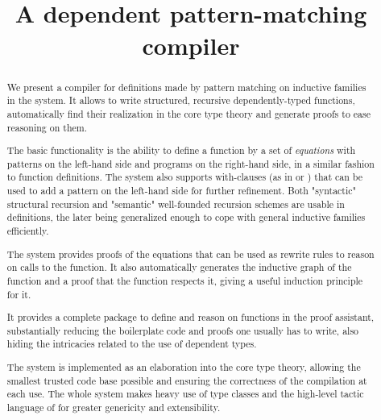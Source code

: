 \documentclass[9pt]{sigplanconf}
\title{\Equations\\
  A dependent pattern-matching compiler}
\begin{document}
\maketitle

\begin{abstract}
  We present a compiler for definitions made by pattern matching on
  inductive families in the \Coq system. It allows to write structured,
  recursive dependently-typed functions, automatically find their
  realization in the core type theory and generate proofs to ease
  reasoning on them.
  
  The basic functionality is the ability to define a function by a set
  of \textit{equations} with patterns on the left-hand side and programs
  on the right-hand side, in a similar fashion to \Haskell
  function definitions. The system also supports with-clauses (as in
  \Epigram or \Agda) that can be used to add a pattern on the left-hand
  side for further refinement. Both "syntactic" structural recursion and
  "semantic" well-founded recursion schemes are usable in definitions,
  the later being generalized enough to cope with general inductive
  families efficiently.
  
  The system provides proofs of the equations that can be used as
  rewrite rules to reason on calls to the function. It also
  automatically generates the inductive graph of the function and a
  proof that the function respects it, giving a useful induction
  principle for it.

  It provides a complete package to define 
  and reason on functions in the proof assistant, substantially
  reducing the boilerplate code and proofs one usually has to write, 
  also hiding the intricacies related to the use of dependent types.
  
  The system is implemented as an elaboration into the core \Coq type
  theory, allowing the smallest trusted code base possible and ensuring 
  the correctness of the compilation at each use.
  The whole system makes heavy use of type classes and the high-level
  tactic language of \Coq for greater genericity and extensibility.
\end{abstract}







  


\end{document}
